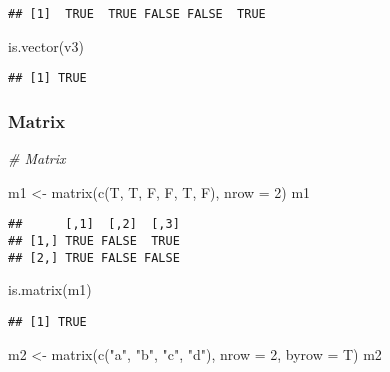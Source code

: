 \documentclass[
]{article}
\newenvironment{Shaded}{\begin{snugshade}}{\end{snugshade}}
\newcommand{\AttributeTok}[1]{\textcolor[rgb]{0.77,0.63,0.00}{#1}}
\newcommand{\CommentTok}[1]{\textcolor[rgb]{0.56,0.35,0.01}{\textit{#1}}}
\newcommand{\DecValTok}[1]{\textcolor[rgb]{0.00,0.00,0.81}{#1}}
\newcommand{\FunctionTok}[1]{\textcolor[rgb]{0.00,0.00,0.00}{#1}}
\newcommand{\NormalTok}[1]{#1}
\newcommand{\OtherTok}[1]{\textcolor[rgb]{0.56,0.35,0.01}{#1}}
\newcommand{\StringTok}[1]{\textcolor[rgb]{0.31,0.60,0.02}{#1}}
\begin{document}
\begin{verbatim}
## [1]  TRUE  TRUE FALSE FALSE  TRUE
\end{verbatim}

\begin{Shaded}
\begin{Highlighting}[]
\FunctionTok{is.vector}\NormalTok{(v3)}
\end{Highlighting}
\end{Shaded}

\begin{verbatim}
## [1] TRUE
\end{verbatim}

\hypertarget{matrix}{%
\subsubsection{Matrix}\label{matrix}}

\begin{Shaded}
\begin{Highlighting}[]
\CommentTok{\# Matrix}

\NormalTok{m1 }\OtherTok{\textless{}{-}} \FunctionTok{matrix}\NormalTok{(}\FunctionTok{c}\NormalTok{(T, T, F, F, T, F), }\AttributeTok{nrow =} \DecValTok{2}\NormalTok{)}
\NormalTok{m1}
\end{Highlighting}
\end{Shaded}

\begin{verbatim}
##      [,1]  [,2]  [,3]
## [1,] TRUE FALSE  TRUE
## [2,] TRUE FALSE FALSE
\end{verbatim}

\begin{Shaded}
\begin{Highlighting}[]
\FunctionTok{is.matrix}\NormalTok{(m1)}
\end{Highlighting}
\end{Shaded}

\begin{verbatim}
## [1] TRUE
\end{verbatim}

\begin{Shaded}
\begin{Highlighting}[]
\NormalTok{m2 }\OtherTok{\textless{}{-}} \FunctionTok{matrix}\NormalTok{(}\FunctionTok{c}\NormalTok{(}\StringTok{"a"}\NormalTok{, }\StringTok{"b"}\NormalTok{, }
               \StringTok{"c"}\NormalTok{, }\StringTok{"d"}\NormalTok{), }
             \AttributeTok{nrow =} \DecValTok{2}\NormalTok{,}
             \AttributeTok{byrow =}\NormalTok{ T)}
\NormalTok{m2}
\end{Highlighting}
\end{Shaded}
\end{document}
